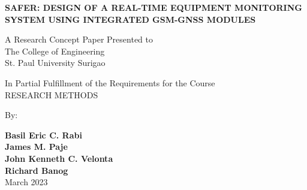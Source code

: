 \documentclass[12pt]{report}
\newcommand{\authora}{
    Basil Eric C. Rabi %
}
\newcommand{\authorb}{
    James M. Paje %
}
\newcommand{\authorc}{
    John Kenneth C. Velonta %
}
\newcommand{\authord}{
    Richard Banog %
}
\newcommand{\thetitle}{SAFER: Design of a Real-Time Equipment Monitoring System Using Integrated GSM-GNSS Modules}
\begin{document}
\thispagestyle{empty}

\begin{center}

\vspace*{1cm}
\textbf{\MakeUppercase{\thetitle}}

\vspace{1.5cm}
A Research Concept Paper Presented to \\
The College of Engineering \\
St. Paul University Surigao

\vfill

In Partial Fulfillment of the Requirements for the Course \\
RESEARCH METHODS

\vspace{1cm}
By:

\vspace{1cm}
\textbf{\authora} \\
\textbf{\authorb} \\
\textbf{\authorc} \\
\textbf{\authord} \\

\vspace{1cm}
March 2023

\end{center}


\pagestyle{fancy}
\fancyhead{}
\fancyfoot{}
\fancyhead[R]{\thepage}

\tableofcontents

\end{document}
